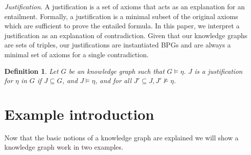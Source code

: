 \documentclass[11pt,letterpaper ,oneside ]{book}
\newtheorem{definition}{Definition}
\begin{document}
	\textit{Justification}. A justification\cite{Horridge:2009} is a set of axioms that acts as an explanation for an entailment.
	Formally, a justification is a minimal subset of the original axioms which are sufficient to prove the entailed formula. In this paper, we interpret a justification as an explanation of contradiction. Given that our knowledge graphs are sets of triples, our justifications are instantiated BPGs and are always a minimal set of axioms for a single contradiction. \\
	
	\begin{definition} 
		Let $G$ be an knowledge graph such that $G \models \eta$. $J$ is a justification for $\eta$ in $G$ if $J \subseteq G$, and $J \models \eta$, and for all $J'\subseteq J, J' \not\models \eta$.  \cite{Horridge:2009}
	\end{definition}
	
	\section{Example introduction}
	Now that the basic notions of a knowledge graph are explained we will show a knowledge graph work in two examples. 
	\begin{figure}[!t]
	\end{figure}
	
\end{document}
